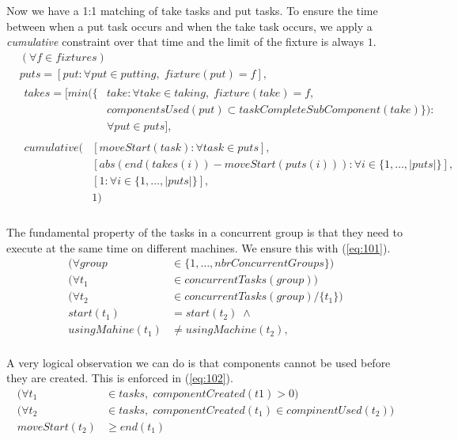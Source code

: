   Now we have a 1:1 matching of take tasks and put tasks. To ensure the time between when a put task occurs and when the take task occurs, we apply a \emph{cumulative} constraint over that time and the limit of the fixture is always $1$.
 \begin{equation}
 \begin{aligned}\label{eq:100}
 &(\forall f \in fixtures) \\
 &puts = [put : \forall put \in putting, \; fixture(put) = f], \\
 &\begin{aligned}
 takes = [min(\{&take : \forall take \in taking, \; fixture(take) = f,\\ &componentsUsed(put) \subset taskCompleteSubComponent(take)\}) : \\
 &\forall put \in puts], 
 \end{aligned}\\
 &\begin{aligned}
 cumulative(&[moveStart(task) : \forall task \in puts], \\ &[abs(end(takes(i))-moveStart(puts(i))) : \forall i \in \{1 , \ldots , |puts|\}], \\
 &[1 : \forall i \in \{1 , \ldots , |puts|\}],\\
 &1)
 \end{aligned}\\
 \end{aligned}
 \end{equation}

  \noindent The fundamental property of the tasks in a concurrent group is that they need to execute at the same time on different machines. We ensure this with (\ref{eq:101}).
 \begin{equation}
 \begin{aligned}\label{eq:101}
 (\forall group &\in \{1 , \ldots , nbrConcurrentGroups\}) \\
 (\forall t_1 &\in concurrentTasks(group)) \\
 (\forall t_2 &\in concurrentTasks(group) / \{t_1\}) \\
 start(t_1) &= start(t_2) \; \land \\
 usingMahine(t_1) &\neq usingMachine(t_2), \\
 \end{aligned}
 \end{equation}

  \noindent A very logical observation we can do is that components cannot be used before they are created. This is enforced in (\ref{eq:102}).
 \begin{equation}
 \begin{aligned}\label{eq:102}
 (\forall t_1 &\in tasks, \; componentCreated(t1) > 0) \\
 (\forall t_2 &\in tasks, \; componentCreated(t_1) \in compinentUsed(t_2)) \\
 moveStart(t_2) &\geq end(t_1) \\
 \end{aligned}
 \end{equation}

